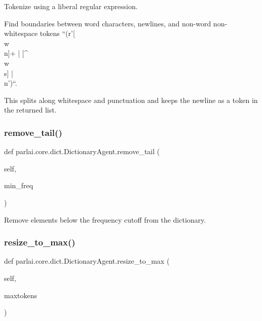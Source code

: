 \begin{DoxyVerb}Tokenize using a liberal regular expression.

Find boundaries between word characters, newlines, and non-word
non-whitespace tokens ``(r'[\\w\\n]+ | [^\\w\\s] | \\n')``.

This splits along whitespace and punctuation and keeps the newline as
a token in the returned list.
\end{DoxyVerb}
 \mbox{\label{classparlai_1_1core_1_1dict_1_1DictionaryAgent_ae828063449b45112d82a97921d35c247}} 
\subsubsection{\texorpdfstring{remove\+\_\+tail()}{remove\_tail()}}
{\footnotesize\ttfamily def parlai.\+core.\+dict.\+Dictionary\+Agent.\+remove\+\_\+tail (\begin{DoxyParamCaption}\item[{}]{self,  }\item[{}]{min\+\_\+freq }\end{DoxyParamCaption})}

\begin{DoxyVerb}Remove elements below the frequency cutoff from the dictionary.
\end{DoxyVerb}
 \mbox{\label{classparlai_1_1core_1_1dict_1_1DictionaryAgent_a1a800c1aecdb97986c59fd26f1b55626}} 
\subsubsection{\texorpdfstring{resize\+\_\+to\+\_\+max()}{resize\_to\_max()}}
{\footnotesize\ttfamily def parlai.\+core.\+dict.\+Dictionary\+Agent.\+resize\+\_\+to\+\_\+max (\begin{DoxyParamCaption}\item[{}]{self,  }\item[{}]{maxtokens }\end{DoxyParamCaption})}

